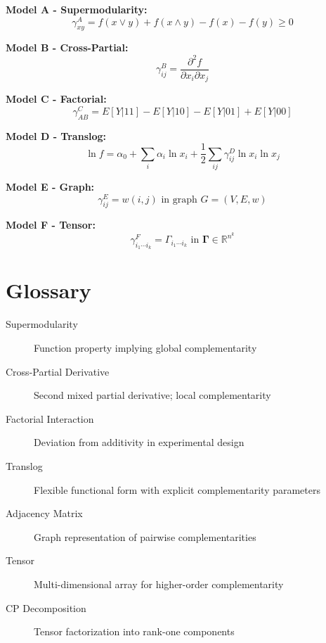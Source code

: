 \begin{tcolorbox}[colback=gray!5!white,colframe=gray!75!black,title=\textbf{Summary: Six Models of Complementarity}]

\textbf{Model A - Supermodularity:}
\begin{equation}
\gamma^A_{xy} = f(x \vee y) + f(x \wedge y) - f(x) - f(y) \geq 0
\end{equation}

\textbf{Model B - Cross-Partial:}
\begin{equation}
\gamma^B_{ij} = \frac{\partial^2 f}{\partial x_i \partial x_j}
\end{equation}

\textbf{Model C - Factorial:}
\begin{equation}
\gamma^C_{AB} = E[Y|11] - E[Y|10] - E[Y|01] + E[Y|00]
\end{equation}

\textbf{Model D - Translog:}
\begin{equation}
\ln f = \alpha_0 + \sum_i \alpha_i \ln x_i + \frac{1}{2} \sum_{ij} \gamma^D_{ij} \ln x_i \ln x_j
\end{equation}

\textbf{Model E - Graph:}
\begin{equation}
\gamma^E_{ij} = w(i, j) \text{ in graph } G = (V, E, w)
\end{equation}

\textbf{Model F - Tensor:}
\begin{equation}
\gamma^F_{i_1 \cdots i_k} = \Gamma_{i_1 \cdots i_k} \text{ in } \boldsymbol{\Gamma} \in \mathbb{R}^{n^k}
\end{equation}

\end{tcolorbox}

\section{Glossary}
\label{sec:glossary}

\begin{description}
    \item[Supermodularity] Function property implying global complementarity
    \item[Cross-Partial Derivative] Second mixed partial derivative; local complementarity
    \item[Factorial Interaction] Deviation from additivity in experimental design
    \item[Translog] Flexible functional form with explicit complementarity parameters
    \item[Adjacency Matrix] Graph representation of pairwise complementarities
    \item[Tensor] Multi-dimensional array for higher-order complementarity
    \item[CP Decomposition] Tensor factorization into rank-one components
\end{description}

